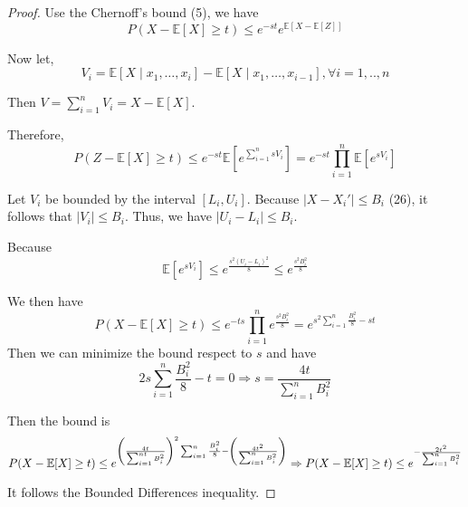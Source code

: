 \begin{proof}
  Use the Chernoff's bound (5), we have
  \begin{equation}
    P(X-\mathbb{E}[X] \geq t) \leq e^{-s t} e^{\mathbb{E}[X-\mathbb{E}[Z]]}
  \end{equation}
  
  Now let,
  \begin{equation}
    V_{i}=\mathbb{E}\left[X \mid x_{1}, \ldots, x_{i}\right]-\mathbb{E}\left[X \mid x_{1}, \ldots, x_{i-1}\right], \forall i=1, . ., n
  \end{equation}
  
  Then $V=\sum_{i=1}^{n} V_{i}=X-\mathbb{E}[X]$.

  Therefore, 
  \begin{equation}
    P(Z-\mathbb{E}[X] \geq t) \leq e^{-s t} \mathbb{E}\left[e^{\sum_{i=1}^{n} s V_{i}}\right]=e^{-s t} \prod_{i=1}^{n} \mathbb{E}\left[e^{s V_{i}}\right]
  \end{equation}

  Let $V_{i}$ be bounded by the interval $[L_i , U_i]$. 
  Because $\left| X - X_{i}' \right| \leq B_{i}$ (26), it follows that $\left| V_i \right| \leq B_i$.
  Thus, we have $\left| U_i - L_{i} \right| \leq B_i$.
  
  Because 
  \begin{equation}
    \mathbb{E}\left[e^{s V_{i}}\right] \leq e^{\frac{s^{2}\left(U_{i}-L_{i}\right)^{2}}{8}} \leq e^{\frac{s^{2} B_{i}^{2}}{8}}
  \end{equation}
  
  We then have 
  \begin{equation}
    P(X-\mathbb{E}[X] \geq t) \leq e^{-t s} \prod_{i=1}^{n} e^{\frac{s^{2} B_{i}^{2}}{8}}=e^{s^{2} \sum_{i=1}^{n} \frac{B_{i}^{2}}{8}-s t}
  \end{equation}
  Then we can minimize the bound respect to $s$ and have
  \begin{equation}
    2 s \sum_{i=1}^{n} \frac{B_{i}^{2}}{8}-t=0 
    \Rightarrow s=\frac{4 t}{\sum_{i=1}^{n} B_{i}^{2}}
  \end{equation}

  Then the bound is 
  \begin{equation}
    P(X-\mathbb{E}[X] \geq t) \leq e^{\left(\frac{4 t}{\sum_{i=1}^{n t} B_{i}^{2}}\right)^{2} \sum_{i=1}^{n} \frac{B_{i}^{2}}{8}-\left(\frac{4 t^{2}}{\sum_{i=1}^{n} B_{i}^{2}}\right)} \\
    \Rightarrow P(X- \mathbb{E}[X] \geq t) \leq e^{- \frac{2t^2}{\sum_{i=1}^{n} B_{i}^2}}
  \end{equation}

  It follows the Bounded Differences inequality.
\end{proof}

